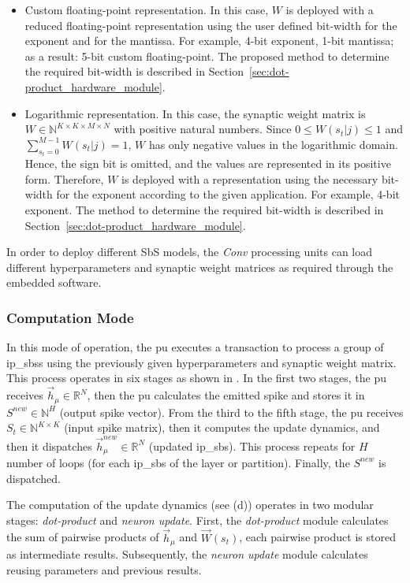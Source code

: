 \begin{itemize}
	\item{Custom floating-point representation}.
	In this case, $W$ is deployed with a reduced floating-point representation using the user defined bit-width for the exponent and for the mantissa. For example, 4-bit exponent, 1-bit mantissa; as a result: 5-bit custom floating-point. The proposed method to determine the required bit-width is described in Section~{\ref{sec:dot-product_hardware_module}}.
	\item{Logarithmic representation}.
	In this case, the synaptic weight matrix is $W\in\mathbb{N}^{K\times K\times M\times N}$ with positive natural numbers. Since $0\le W(s_t|j)\le1$ and $\sum_{s_t=0}^{M-1}W(s_t|j)=1$, $W$ has only negative values in the logarithmic domain. Hence, the sign bit is omitted, and the values are represented in its positive form. Therefore, $W$ is deployed with a representation using the necessary bit-width for the exponent according to the given application. For example, 4-bit exponent. The method to determine the required bit-width is described in Section~{\ref{sec:dot-product_hardware_module}}.
\end{itemize}

In order to deploy different SbS models, the \emph{Conv} processing units can load different hyperparameters and synaptic weight matrices as required through the embedded software.

\subsubsection{Computation Mode}
In this mode of operation, the \gls{pu} executes a transaction to process a group of \glspl{ip_sbs} using the previously given hyperparameters and synaptic weight matrix. This process operates in six stages as shown in . In the first two stages, the \gls{pu} receives $\vec{h}_\mu\in\mathbb{R}^{N}$, then the \gls{pu} calculates the emitted spike and stores it in $S^{new}\in\mathbb{N}^{H}$ (output spike vector). From the third to the fifth stage, the \gls{pu} receives $S_t\in\mathbb{N}^{K\times K}$ (input spike matrix), then it computes the update dynamics, and then it dispatches $\vec{h}_\mu^{new}\in\mathbb{R}^{N}$ (updated \gls{ip_sbs}). This process repeats for $H$ number of loops (for each \gls{ip_sbs} of the layer or partition). Finally, the $S^{new}$ is dispatched.

The computation of the update dynamics (see (d)) operates in two modular stages: \emph{dot-product} and \emph{neuron update}. First, the \emph{dot-product} module calculates the sum of pairwise products of $\vec{h}_{\mu}$ and $\vec{W}(s_t)$, each pairwise product is stored as intermediate results. Subsequently, the \emph{neuron update} module calculates  reusing parameters and previous results.


